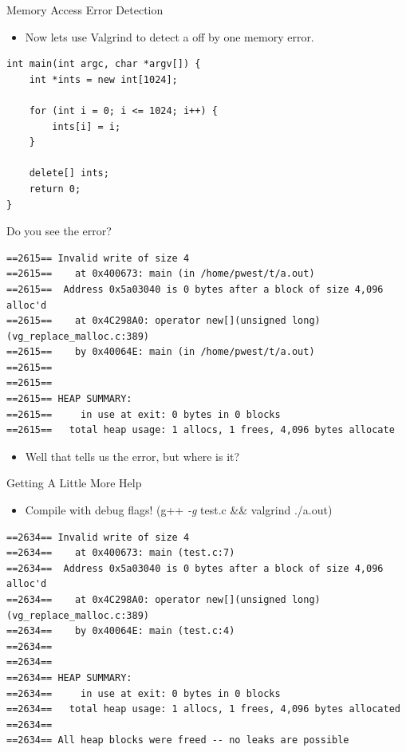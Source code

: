 \documentclass{beamer}
\begin{document}
\begin{frame}[fragile]{Memory Access Error Detection}
\begin{itemize}
\item Now lets use Valgrind to detect a off by one memory error.
\end{itemize}
\begin{lstlisting}
int main(int argc, char *argv[]) {
    int *ints = new int[1024];

    for (int i = 0; i <= 1024; i++) {
        ints[i] = i;
    }

    delete[] ints;
    return 0;
}
\end{lstlisting}
Do you see the error?
\begin{lstlisting}
==2615== Invalid write of size 4
==2615==    at 0x400673: main (in /home/pwest/t/a.out)
==2615==  Address 0x5a03040 is 0 bytes after a block of size 4,096 alloc'd
==2615==    at 0x4C298A0: operator new[](unsigned long) (vg_replace_malloc.c:389)
==2615==    by 0x40064E: main (in /home/pwest/t/a.out)
==2615== 
==2615== 
==2615== HEAP SUMMARY:
==2615==     in use at exit: 0 bytes in 0 blocks
==2615==   total heap usage: 1 allocs, 1 frees, 4,096 bytes allocate
\end{lstlisting}
\begin{itemize}
\item Well that tells us the error, but where is it?
\end{itemize}
\end{frame}

\begin{frame}[fragile]{Getting A Little More Help}
\begin{itemize}
\item Compile with debug flags! (g++ \textit{-g} test.c \&\& valgrind ./a.out)
\end{itemize}
\begin{lstlisting}
==2634== Invalid write of size 4
==2634==    at 0x400673: main (test.c:7)
==2634==  Address 0x5a03040 is 0 bytes after a block of size 4,096 alloc'd
==2634==    at 0x4C298A0: operator new[](unsigned long) (vg_replace_malloc.c:389)
==2634==    by 0x40064E: main (test.c:4)
==2634== 
==2634== 
==2634== HEAP SUMMARY:
==2634==     in use at exit: 0 bytes in 0 blocks
==2634==   total heap usage: 1 allocs, 1 frees, 4,096 bytes allocated
==2634== 
==2634== All heap blocks were freed -- no leaks are possible
\end{lstlisting}
\end{frame}
\end{document}
